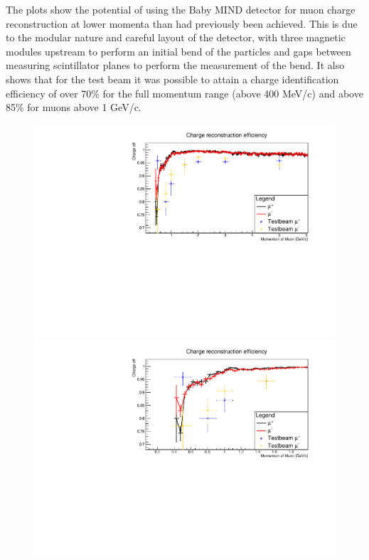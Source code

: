 The plots show the potential of using the Baby MIND detector for muon charge reconstruction at lower momenta than had previously been achieved. This is due to the modular nature and careful layout of the detector, with three magnetic modules upstream to perform an initial bend of the particles and gaps between measuring scintillator planes to perform the measurement of the bend. It also shows that for the test beam it was possible to attain a charge identification efficiency of over 70\% for the full momentum range (above 400 MeV/c) and above 85\% for muons above 1 GeV/c. %

\begin{figure}[h!]
\centering

\includegraphics[width=\textwidth]
{figures/TMVAnew/TMVAnewChargeIDFull.pdf}%

\includegraphics[width=\textwidth]{figures/TMVAnew/TMVAnewChargeIDLow.pdf}


\end{figure}
